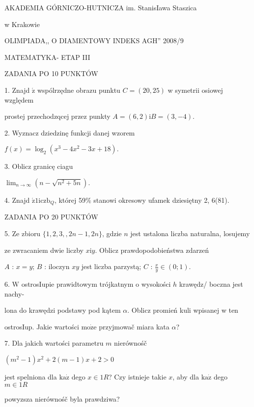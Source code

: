 \documentclass[a4paper,12pt]{article}
\begin{document}
AKADEMIA GÓRNICZO-HUTNICZA im. StanisIawa Staszica

w Krakowie

OLIMPIADA,, O DIAMENTOWY INDEKS AGH'' 2008/9

MATEMATYKA- ETAP III

ZADANIA PO 10 PUNKTÓW

1. Znajd $\acute{\mathrm{z}}$ wspólrzędne obrazu punktu $C = (20,25)$ w symetrii osiowej względem

prostej przechodzqcej przez punkty $A=(6,2)\mathrm{i}B=(3,-4).$

2. Wyznacz dziedzinę funkcji danej wzorem

$f(x)=\log_{2}(x^{3}-4x^{2}-3x+18).$

3. Oblicz granicę ciagu

$\displaystyle \lim_{n\rightarrow\infty}(n-\sqrt{n^{2}+5n}).$

4. Znajd $\acute{\mathrm{z}}1\mathrm{i}\mathrm{c}\mathrm{z}\mathrm{b}_{Q}$, której 59\% stanowi okresowy ufamek dziesiętny 2, 6(81).

ZADANIA PO 20 PUNKTÓW

5. Ze zbioru $\{1,2,3, ,2n-1,2n\}$, gdzie $n$ jest ustalona liczba naturalna, losujemy

ze zwracaniem dwie liczby $x\mathrm{i}y$. Oblicz prawdopodobieństwa zdarzeń

$A$ : $x=y$; $B$ : iloczyn $xy$ jest liczba parzystą; $C$ : $\displaystyle \frac{x}{y}\in(0;1).$

6. $\mathrm{W}$ ostrosIupie prawidtowym trójkatnym o wysokości $h$ krawędz/ boczna jest nachy-

lona do krawędzi podstawy pod kątem $\alpha$. Oblicz promień kuli wpisanej w ten

ostrosIup. Jakie wartości $\mathrm{m}\mathrm{o}\dot{\mathrm{z}}\mathrm{e}$ przyjmowač miara kata $\alpha$?

7. Dla jakich wartości parametru $m$ nierównośč

$(m^{2}-1)x^{2}+2(m-1)x+2>0$

jest spelniona dla $\mathrm{k}\mathrm{a}\dot{\mathrm{z}}$ dego $x \in 1R$? Czy istnieje takie $x$, aby dla $\mathrm{k}\mathrm{a}\dot{\mathrm{z}}$ dego $m \in 1R$

powyzsza nierównośč byla prawdziwa?
\end{document}

